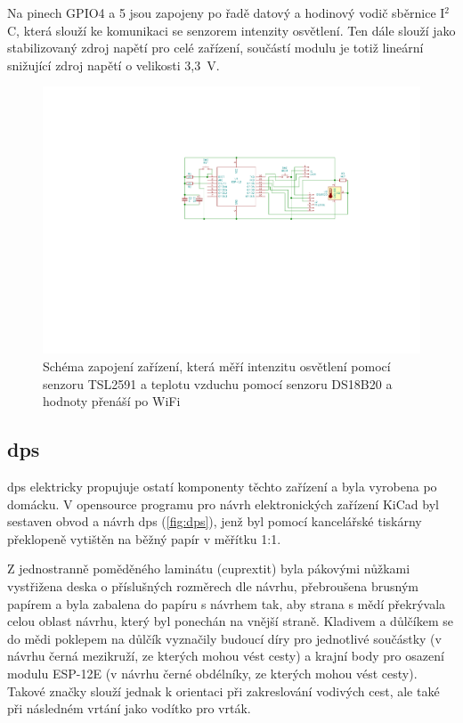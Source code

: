         Na pinech GPIO4 a 5 jsou zapojeny po řadě datový a hodinový vodič sběrnice I$^2$C, která slouží ke komunikaci se senzorem intenzity osvětlení. Ten dále slouží jako stabilizovaný zdroj napětí pro celé zařízení, součástí modulu je totiž lineární snižující zdroj napětí o velikosti 3{,}3~V.
        \begin{figure}
            \centering
            \includegraphics[draft=false,width=\textwidth,trim={10.8cm 10cm 5.5cm 5.3cm},clip]{img/hw/esp_lux_temp_sch.pdf}
            \caption[Schéma zapojení měřicích zařízení]{Schéma zapojení zařízení, která měří intenzitu osvětlení pomocí senzoru TSL2591 a teplotu vzduchu pomocí senzoru DS18B20 a hodnoty přenáší po WiFi}
            \label{fig:schema}
        \end{figure}
    \subsection{\Acrlong{dps}}
        \acrshort{dps} elektricky propujuje ostatí komponenty těchto zařízení a byla vyrobena po domácku. V opensource programu pro návrh elektronických zařízení KiCad byl sestaven obvod a návrh \acrshort{dps} (\cref{fig:dps}), jenž byl pomocí kancelářské tiskárny překlopeně vytištěn na běžný papír v měřítku 1:1.
        
        Z jednostranně poměděného laminátu (cuprextit) byla pákovými nůžkami vystřižena deska o příslušných rozměrech dle návrhu, přebroušena brusným papírem a byla zabalena do papíru s návrhem tak, aby strana s mědí překrývala celou oblast návrhu, který byl ponechán na vnější straně. Kladivem a důlčíkem se do mědi poklepem na důlčík vyznačily budoucí díry pro jednotlivé součástky (v návrhu černá mezikruží, ze kterých mohou vést cesty) a krajní body pro osazení modulu ESP-12E (v návrhu černé obdélníky, ze kterých mohou vést cesty). Takové značky slouží jednak k orientaci při zakreslování vodivých cest, ale také při následném vrtání jako vodítko pro vrták.
        
